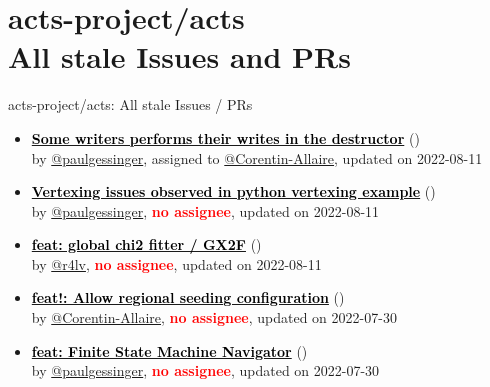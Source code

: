 \section{ acts-project/acts \\ All stale Issues and PRs}
\begin{frame}[allowframebreaks]{ acts-project/acts: All stale Issues / PRs}
  \begin{itemize}
    
    \item\iss\prstale\textbf{\href{https://github.com/acts-project/acts/issues/881}{\textcolor{black}{Some writers performs their writes in the destructor}}}
    (\href{https://github.com/acts-project/acts/issues/881}{}) \\
    by \href{https://github.com/paulgessinger}{@paulgessinger}, {}assigned to \href{https://github.com/Corentin-Allaire}{@Corentin-Allaire}, updated on 2022-08-11

    \item\iss\prstale\textbf{\href{https://github.com/acts-project/acts/issues/1091}{\textcolor{black}{Vertexing issues observed in python vertexing example}}}
    (\href{https://github.com/acts-project/acts/issues/1091}{}) \\
    by \href{https://github.com/paulgessinger}{@paulgessinger}, {}\textbf{\textcolor{Red}{no assignee}}, updated on 2022-08-11

    \item\propen\prwip\prstale\textbf{\href{https://github.com/acts-project/acts/pull/1099}{\textcolor{black}{feat: global chi2 fitter / GX2F}}}
    (\href{https://github.com/acts-project/acts/pull/1099}{}) \\
    by \href{https://github.com/r4lv}{@r4lv}, {}\textbf{\textcolor{Red}{no assignee}}, updated on 2022-08-11

    \item\propen\prwip\prstale\textbf{\href{https://github.com/acts-project/acts/pull/1187}{\textcolor{black}{feat!: Allow regional seeding configuration}}}
    (\href{https://github.com/acts-project/acts/pull/1187}{}) \\
    by \href{https://github.com/Corentin-Allaire}{@Corentin-Allaire}, {}\textbf{\textcolor{Red}{no assignee}}, updated on 2022-07-30

    \item\propen\prwip\prstale\textbf{\href{https://github.com/acts-project/acts/pull/1291}{\textcolor{black}{feat: Finite State Machine Navigator}}}
    (\href{https://github.com/acts-project/acts/pull/1291}{}) \\
    by \href{https://github.com/paulgessinger}{@paulgessinger}, {}\textbf{\textcolor{Red}{no assignee}}, updated on 2022-07-30


\end{itemize}
\end{frame}
